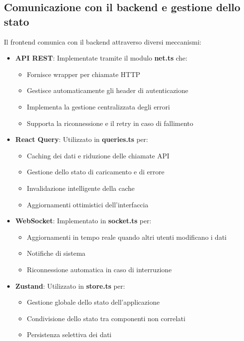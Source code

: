 \documentclass[11pt]{article}
\begin{document}
\subsection{Comunicazione con il backend e gestione dello stato}
Il frontend comunica con il backend attraverso diversi meccanismi:
\begin{itemize}
    \item \textbf{API REST}: Implementate tramite il modulo \textbf{net.ts} che:
    \begin{itemize}
        \item Fornisce wrapper per chiamate HTTP
        \item Gestisce automaticamente gli header di autenticazione
        \item Implementa la gestione centralizzata degli errori
        \item Supporta la riconnessione e il retry in caso di fallimento
    \end{itemize}

    \item \textbf{React Query}: Utilizzato in \textbf{queries.ts} per:
    \begin{itemize}
        \item Caching dei dati e riduzione delle chiamate API
        \item Gestione dello stato di caricamento e di errore
        \item Invalidazione intelligente della cache
        \item Aggiornamenti ottimistici dell'interfaccia
    \end{itemize}

    \item \textbf{WebSocket}: Implementato in \textbf{socket.ts} per:
    \begin{itemize}
        \item Aggiornamenti in tempo reale quando altri utenti modificano i dati
        \item Notifiche di sistema
        \item Riconnessione automatica in caso di interruzione
    \end{itemize}

    \item \textbf{Zustand}: Utilizzato in \textbf{store.ts} per:
    \begin{itemize}
        \item Gestione globale dello stato dell'applicazione
        \item Condivisione dello stato tra componenti non correlati
        \item Persistenza selettiva dei dati
    \end{itemize}


\end{itemize}
\end{document}
